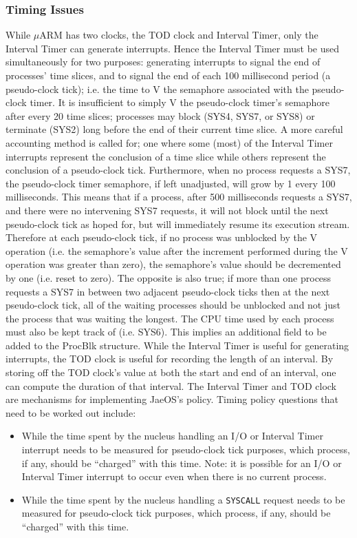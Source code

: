 \subsubsection{Timing Issues}
	While $\mu$ARM has two clocks, the TOD clock and Interval Timer, only the
Interval Timer can generate interrupts. Hence the Interval Timer must be
used simultaneously for two purposes: generating interrupts to signal the
end
of processes' time slices, and to signal the end of each 100 millisecond
period
(a pseudo-clock tick); i.e. the time to V the semaphore associated with the
pseudo-clock timer.
It is insufficient to simply V the pseudo-clock timer's semaphore after
every 20 time slices; processes may block (SYS4, SYS7, or SYS8) or terminate (SYS2) long before the end of their current time slice. A more careful
accounting method is called for; one where some (most) of the Interval
Timer interrupts represent the conclusion of a time slice while others
represent the conclusion of a pseudo-clock tick.
Furthermore, when no process requests a SYS7, the pseudo-clock timer
semaphore, if left unadjusted, will grow by 1 every 100 milliseconds. This
means that if a process, after 500 milliseconds requests a SYS7, and there
were no intervening SYS7 requests, it will not block until the next pseudo-clock tick as hoped for, but will immediately resume its execution stream.
Therefore at each pseudo-clock tick, if no process was unblocked by the V
operation (i.e. the semaphore's value after the increment performed during
the V operation was greater than zero), the semaphore's value should be
decremented by one (i.e. reset to zero).
The opposite is also true; if more than one process requests a SYS7 in
between two adjacent pseudo-clock ticks then at the next pseudo-clock tick,
all of the waiting processes should be unblocked and not just the process
that was waiting the longest.
The CPU time used by each process must also be kept track of (i.e. SYS6).
This implies an additional field to be added to the ProcBlk structure.
While the Interval Timer is useful for generating interrupts, the TOD clock
is useful for recording the length of an interval. By storing off the TOD
clock's value at both the start and end of an interval, one can compute the
duration of that interval.
The Interval Timer and TOD clock are mechanisms for implementing
JaeOS's policy. Timing policy questions that need to be worked out include:
\begin{itemize}
\item While the time spent by the nucleus handling an I/O or Interval Timer
interrupt needs to be measured for pseudo-clock tick purposes, which
process, if any, should be “charged” with this time. Note: it is possible
for an I/O or Interval Timer interrupt to occur even when there is no
current process.
\item While the time spent by the nucleus handling a \verb+SYSCALL+ request
needs to be measured for pseudo-clock tick purposes, which process, if
any, should be “charged” with this time.
\end{itemize}
